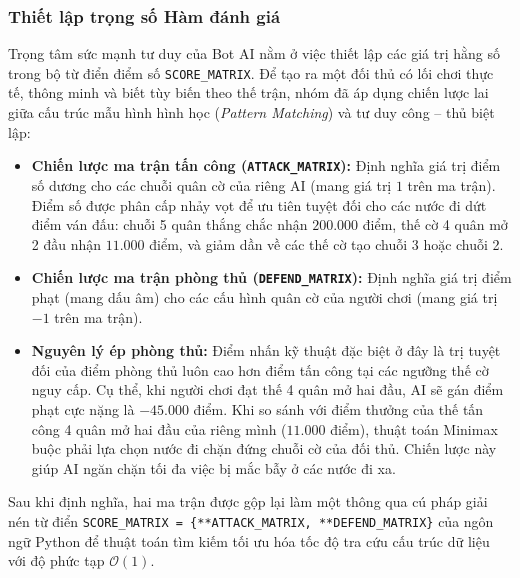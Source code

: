 \subsubsection{Thiết lập trọng số Hàm đánh giá}
Trọng tâm sức mạnh tư duy của Bot AI nằm ở việc thiết lập các giá trị hằng số trong bộ từ điển điểm số \texttt{SCORE\_MATRIX}. Để tạo ra một đối thủ có lối chơi thực tế, thông minh và biết tùy biến theo thế trận, nhóm đã áp dụng chiến lược lai giữa cấu trúc mẫu hình hình học (\textit{Pattern Matching}) và tư duy công -- thủ biệt lập:
\begin{itemize}
	\item \textbf{Chiến lược ma trận tấn công (\texttt{ATTACK\_MATRIX}):} Định nghĩa giá trị điểm số dương cho các chuỗi quân cờ của riêng AI (mang giá trị $1$ trên ma trận). Điểm số được phân cấp nhảy vọt để ưu tiên tuyệt đối cho các nước đi dứt điểm ván đấu: chuỗi 5 quân thắng chắc nhận $200.000$ điểm, thế cờ 4 quân mở 2 đầu nhận $11.000$ điểm, và giảm dần về các thế cờ tạo chuỗi 3 hoặc chuỗi 2.
	\item \textbf{Chiến lược ma trận phòng thủ (\texttt{DEFEND\_MATRIX}):} Định nghĩa giá trị điểm phạt (mang dấu âm) cho các cấu hình quân cờ của người chơi (mang giá trị $-1$ trên ma trận). 
	\item \textbf{Nguyên lý ép phòng thủ:} Điểm nhấn kỹ thuật đặc biệt ở đây là trị tuyệt đối của điểm phòng thủ luôn cao hơn điểm tấn công tại các ngưỡng thế cờ nguy cấp. Cụ thể, khi người chơi đạt thế 4 quân mở hai đầu, AI sẽ gán điểm phạt cực nặng là $-45.000$ điểm. Khi so sánh với điểm thưởng của thế tấn công 4 quân mở hai đầu của riêng mình ($11.000$ điểm), thuật toán Minimax buộc phải lựa chọn nước đi chặn đứng chuỗi cờ của đối thủ. Chiến lược này giúp AI ngăn chặn tối đa việc bị mắc bẫy ở các nước đi xa.
\end{itemize}

Sau khi định nghĩa, hai ma trận được gộp lại làm một thông qua cú pháp giải nén từ điển \texttt{SCORE\_MATRIX = \{**ATTACK\_MATRIX, **DEFEND\_MATRIX\}} của ngôn ngữ Python để thuật toán tìm kiếm tối ưu hóa tốc độ tra cứu cấu trúc dữ liệu với độ phức tạp $\mathcal{O}(1)$.


